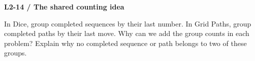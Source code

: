 \documentclass[11pt,a4paper]{article}
\begin{document}
\par\noindent\begin{minipage}{\linewidth}
\textbf{L2-14 / The shared counting idea}\par\smallskip In Dice, group completed sequences by their last number. In Grid Paths, group completed paths by their last move. Why can we add the group counts in each problem? Explain why no completed sequence or path belongs to two of these groups.\par
\end{minipage}\par\vspace{4mm}
\end{document}
